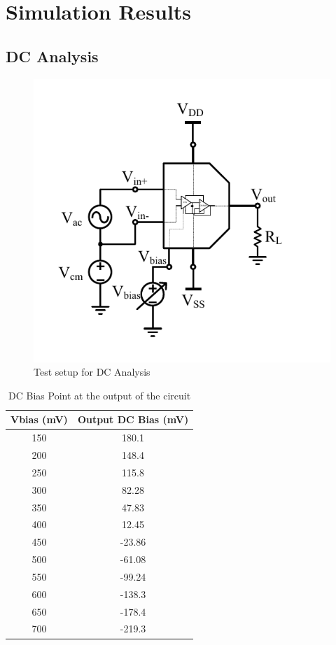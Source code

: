 \chapter{Simulation Results}
\section{DC Analysis}
\begin{figure} [H]
\centering
\includegraphics[scale=1]{Figures/Test_Benches/Overall/ACDC.pdf}
\caption{Test setup for DC Analysis}
\end{figure}

\begin{table} [H]
\centering
\begin{tabular}{@{}cc@{}}
\toprule
Vbias (mV)			& Output DC Bias (mV)	\\ \midrule
150					& 180.1  \\
200					& 148.4  \\
250					& 115.8  \\
300					& 82.28	 \\
350					& 47.83	 \\
400					& 12.45	 \\
450					& -23.86 \\
500					& -61.08 \\
550					& -99.24 \\
600					& -138.3 \\
650					& -178.4 \\
700 				& -219.3 \\
\bottomrule
\end{tabular}
\caption{DC Bias Point at the output of the circuit}
\end{table}


